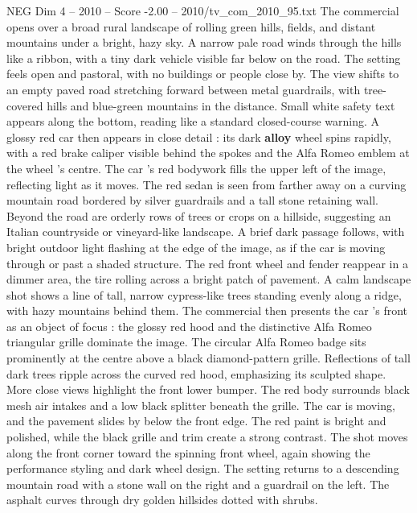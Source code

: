 \begin{textsample}{NEG Dim 4 – 2010 – Score -2.00 – 2010/tv\_com\_2010\_95.txt}  \label{ex:f4_neg_071}
The commercial opens over a broad rural landscape of rolling green hills, fields, and distant mountains under a bright, hazy sky.
A narrow pale road winds through the hills like a ribbon, with a tiny dark vehicle visible far below on the road.
The setting feels open and pastoral, with no buildings or people close by.
The view shifts to an empty paved road stretching forward between metal guardrails, with tree-covered hills and blue-green mountains in the distance.
Small white safety text appears along the bottom, reading like a standard closed-course warning.
A glossy red car then appears in close detail : its dark \textbf{alloy} wheel spins rapidly, with a red brake caliper visible behind the spokes and the Alfa Romeo emblem at the wheel ’s centre.
The car ’s red bodywork fills the upper left of the image, reflecting light as it moves.
The red sedan is seen from farther away on a curving mountain road bordered by silver guardrails and a tall stone retaining wall.
Beyond the road are orderly rows of trees or crops on a hillside, suggesting an Italian countryside or vineyard-like landscape.
A brief dark passage follows, with bright outdoor light flashing at the edge of the image, as if the car is moving through or past a shaded structure.
The red front wheel and fender reappear in a dimmer area, the tire rolling across a bright patch of pavement.
A calm landscape shot shows a line of tall, narrow cypress-like trees standing evenly along a ridge, with hazy mountains behind them.
The commercial then presents the car ’s front as an object of focus : the glossy red hood and the distinctive Alfa Romeo triangular grille dominate the image.
The circular Alfa Romeo badge sits prominently at the centre above a black diamond-pattern grille.
Reflections of tall dark trees ripple across the curved red hood, emphasizing its sculpted shape.
More close views highlight the front lower bumper.
The red body surrounds black mesh air intakes and a low black splitter beneath the grille.
The car is moving, and the pavement slides by below the front edge.
The red paint is bright and polished, while the black grille and trim create a strong contrast.
The shot moves along the front corner toward the spinning front wheel, again showing the performance styling and dark wheel design.
The setting returns to a descending mountain road with a stone wall on the right and a guardrail on the left.
The asphalt curves through dry golden hillsides dotted with shrubs.

\end{textsample}
